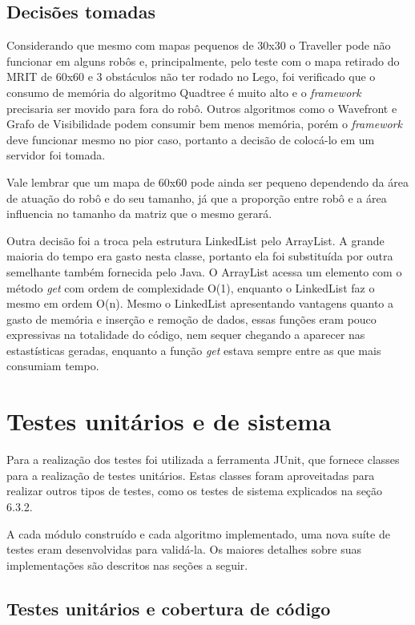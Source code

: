 \subsection{Decisões tomadas}

Considerando que mesmo com mapas pequenos de 30x30 o Traveller pode não funcionar em alguns robôs e, principalmente, pelo teste com o mapa retirado do MRIT de 60x60 e 3 obstáculos não ter rodado no Lego, foi verificado que o consumo de memória do algoritmo Quadtree é muito alto e o \textit{framework} precisaria ser movido para fora do robô. Outros algoritmos como o Wavefront e Grafo de Visibilidade podem consumir bem menos memória, porém o \textit{framework} deve funcionar mesmo no pior caso, portanto a decisão de colocá-lo em um servidor foi tomada.

Vale lembrar que um mapa de 60x60 pode ainda ser pequeno dependendo da área de atuação do robô e do seu tamanho, já que a proporção entre robô e a área influencia no tamanho da matriz que o mesmo gerará.

Outra decisão foi a troca pela estrutura LinkedList pelo ArrayList. A grande maioria do tempo era gasto nesta classe, portanto ela foi substituída por outra semelhante também fornecida pelo Java. O ArrayList acessa um elemento com o método \textit{get} com ordem de complexidade O(1), enquanto o LinkedList faz o mesmo em ordem O(n). Mesmo o LinkedList apresentando vantagens quanto a gasto de memória e inserção e remoção de dados, essas funções eram pouco expressivas na totalidade do código, nem sequer chegando a aparecer nas estastísticas geradas, enquanto a função \textit{get} estava sempre entre as que mais consumiam tempo.

\section{Testes unitários e de sistema}

Para a realização dos testes foi utilizada a ferramenta JUnit, que fornece classes para a realização de testes unitários. Estas classes foram aproveitadas para realizar outros tipos de testes, como os testes de sistema explicados na seção 6.3.2.

A cada módulo construído e cada algoritmo implementado, uma nova suíte de testes eram desenvolvidas para validá-la. Os maiores detalhes sobre suas implementações são descritos nas seções a seguir.

\subsection{Testes unitários e cobertura de código}

